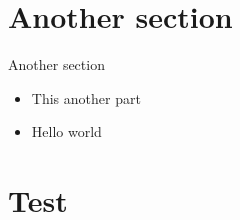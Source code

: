 \section{Another section}


\begin{frame}[fragile]{Another section}

\begin{itemize}
\item\relax 
This another part



\item\relax 
Hello world




\end{itemize}
\end{frame}

\section{Test}

